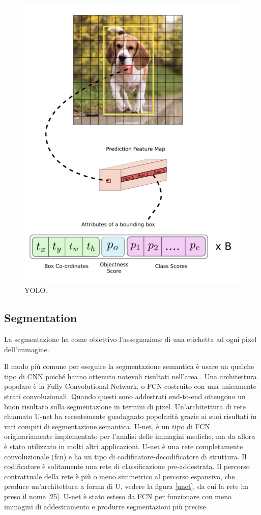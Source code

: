 \begin{figure}[htb]
	\centering
	\includegraphics[width = 120mm]{images/yolo_od.png}
	\caption{YOLO.}
	\label{yolo_od}
\end{figure}



\subsection{Segmentation}

La segmentazione ha come obiettivo l'assegnazione di una etichetta ad ogni pixel dell'immagine. 

Il modo più comune per eseguire la segmentazione semantica è usare un qualche tipo di CNN poiché hanno ottenuto notevoli risultati nell'area \cite{liu2019recent}. Una architettura popolare è la Fully Convolutional Network, o FCN  \cite{long2015fully} costruito con una unicamente strati convoluzionali. Quando questi sono addestrati end-to-end ottengono un buon risultato sulla segmentazione in termini di pixel. Un'architettura di rete chiamato U-net \cite{ronneberger2015u} ha recentemente guadagnato popolarità grazie ai suoi risultati in vari compiti di segmentazione semantica. U-net, è un tipo di FCN originariamente implementato per l'analisi delle immagini mediche, ma da allora è stato utilizzato in molti altri applicazioni. U-net è una rete completamente convoluzionale (fcn) e ha un tipo di codificatore-decodificatore di struttura. Il codificatore è solitamente una rete di classificazione pre-addestrata. Il percorso contrattuale della rete è più o meno simmetrico al percorso espansivo, che produce un'architettura a forma di U, vedere la figura \ref{unet}, da cui la rete ha preso il nome [25]. U-net è stato esteso da FCN per funzionare con meno immagini di addestramento e produrre segmentazioni più precise.

